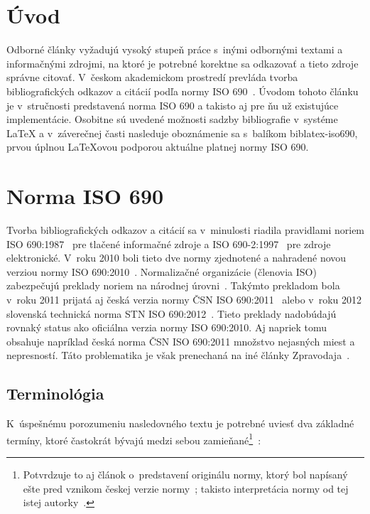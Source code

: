 \documentclass{csbulletin}
\begin{document}
\begin{refsection}

\section{Úvod}

Odborné články vyžadujú vysoký stupeň práce s~inými odbornými textami
a informačnými zdrojmi, na ktoré je potrebné korektne sa odkazovať a
tieto zdroje správne citovať. V~českom akademickom prostredí prevláda
tvorba bibliografických odkazov a citácií podľa normy
ISO 690~\cite{Kratochvil2011}. Úvodom tohoto článku je v~stručnosti
predstavená norma ISO 690 a takisto aj pre ňu už existujúce
implementácie. Osobitne sú uvedené možnosti sadzby bibliografie
v~systéme \LaTeX{} a v~záverečnej časti nasleduje oboznámenie sa
s~balíkom \textsf{biblatex-iso690}, prvou úplnou \LaTeX{}ovou
podporou aktuálne platnej normy ISO 690.


\section{Norma ISO 690}

Tvorba bibliografických odkazov a citácií sa v~minulosti riadila
pravidlami noriem ISO 690:1987~\cite{iso690:1987} pre tlačené
informačné zdroje a ISO 690-2:1997~\cite{iso690:2:1997} pre zdroje
elektronické. V~roku 2010 boli tieto dve normy zjednotené a nahradené
novou verziou normy ISO 690:2010~\cite{iso690:2010}. Normalizačné
organizácie (členovia ISO) zabezpečujú preklady noriem na národnej
úrovni~\cite{isoMembershipManual}. Takýmto prekladom bola v~roku 2011
prijatá aj česká verzia normy ČSN ISO 690:2011~\cite{csn:iso690:2011}
alebo v~roku 2012 slovenská technická norma
STN ISO 690:2012~\cite{stn:iso690:2012}. Tieto preklady nadobúdajú
rovnaký status ako oficiálna verzia normy ISO 690:2010. Aj napriek
tomu obsahuje napríklad česká norma ČSN ISO 690:2011 množstvo
nejasných miest a nepresností. Táto problematika je však prenechaná
na iné články Zpravodaja~\cite{Hala2013}.

\subsection{Terminológia}

K~úspešnému porozumeniu nasledovného textu je potrebné uviesť dva
základné termíny, ktoré častokrát bývajú medzi sebou
zamieňané\footnote{Potvrdzuje to aj článok o~predstavení originálu
normy, ktorý bol napísaný ešte pred vznikom českej verzie
normy~\cite{Bratkova2010}; takisto interpretácia normy od tej istej
autorky~\cite{Bratkova2011}.}~\cite{csn:iso690:2011}:


\end{refsection}
\end{document}

